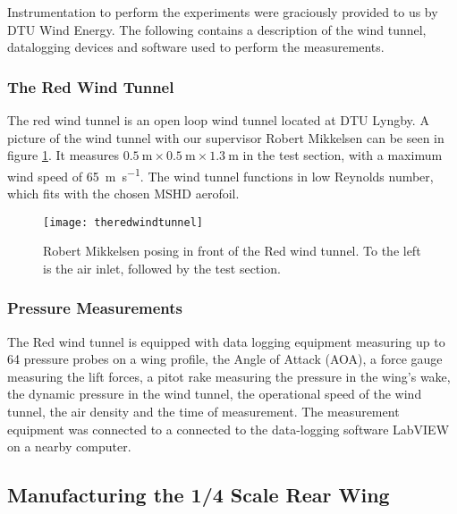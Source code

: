     Instrumentation to perform the experiments were graciously provided to us by DTU Wind Energy. The following contains a description of the wind tunnel, datalogging devices and software used to perform the measurements.

    \subsubsection{The Red Wind Tunnel}

      The red wind tunnel is an open loop wind tunnel located at DTU Lyngby. A picture of the wind tunnel with our supervisor Robert Mikkelsen can be seen in figure \ref{fig:theredwindtunnel}. It measures $\SI{0.5}{\metre} \times \SI{0.5}{\metre} \times \SI{1.3}{\metre}$ in the test section, with a maximum wind speed of \SI{65}{\metre\per\second}. The wind tunnel functions in low Reynolds number, which fits with the chosen MSHD aerofoil.

      \begin{figure}
        \texttt{[image: theredwindtunnel]}
        \caption{Robert Mikkelsen posing in front of the Red wind tunnel. To the left is the air inlet, followed by the test section.}
        \label{fig:theredwindtunnel}
      \end{figure}

    \subsubsection{Pressure Measurements}

      The Red wind tunnel is equipped with data logging equipment measuring up to 64 pressure probes on a wing profile, the Angle of Attack (AOA), a force gauge measuring the lift forces, a pitot rake measuring the pressure in the wing's wake, the dynamic pressure in the wind tunnel, the operational speed of the wind tunnel, the air density and the time of measurement. The measurement equipment was connected to a  connected to the data-logging software LabVIEW on a nearby computer.

  \subsection{Manufacturing the 1/4 Scale Rear Wing}


